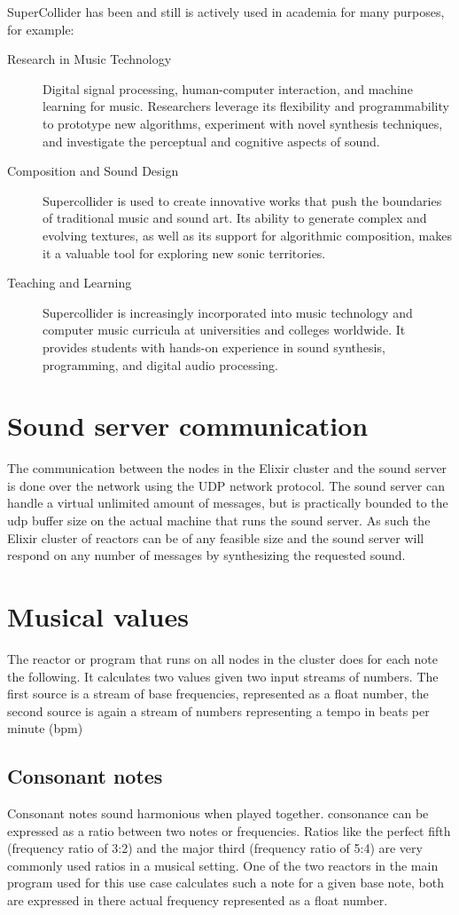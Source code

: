 \documentclass[a4paper]{book}
\begin{document}
SuperCollider has been and still is actively used in academia for many purposes, for example:
\begin{description}
	\item[Research in Music Technology] Digital signal processing, human-computer interaction, and machine learning for music. Researchers leverage its flexibility and programmability to prototype new algorithms, experiment with novel synthesis techniques, and investigate the perceptual and cognitive aspects of sound.
	\item[Composition and Sound Design] Supercollider is used to create innovative works that push the boundaries of traditional music and sound art. Its ability to generate complex and evolving textures, as well as its support for algorithmic composition, makes it a valuable tool for exploring new sonic territories.
	\item[Teaching and Learning] Supercollider is increasingly incorporated into music technology and computer music curricula at universities and colleges worldwide. It provides students with hands-on experience in sound synthesis, programming, and digital audio processing.

\end{description} 
\section{Sound server communication}
The communication between the nodes in the Elixir cluster and the sound server is done over the network using the UDP network protocol. The sound server can handle a virtual unlimited amount of messages, but is practically bounded to the udp buffer size on the actual machine that runs the sound server. As such the Elixir cluster of reactors can be of any feasible size and the sound server will respond on any number of messages by synthesizing the requested sound. 

\section{Musical values}
The reactor or program that runs on all nodes in the cluster does for each note the following. It calculates two values given two input streams of numbers. The first source is a stream of base frequencies, represented as a float number, the second source is again a stream of numbers representing a tempo in beats per minute (bpm)

\subsection*{Consonant notes}
Consonant notes sound harmonious when played together. consonance can be expressed as a ratio between two notes or frequencies. Ratios like the perfect fifth (frequency ratio of 3:2) and the major third (frequency ratio of 5:4) are very commonly used ratios in a musical setting. One of the two reactors in the main program used for this use case calculates such a note for a given base note, both are expressed in there actual frequency represented as a float number.
\end{document}
